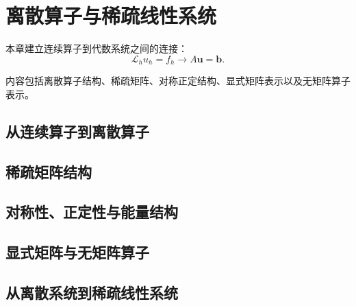 \chapter{离散算子与稀疏线性系统}
\label{ch:discrete-operator}

本章建立连续算子到代数系统之间的连接：
\[
\mathcal{L}_h u_h=f_h\rightarrow A\bm u=\bm b.
\]

内容包括离散算子结构、稀疏矩阵、对称正定结构、显式矩阵表示以及无矩阵算子表示。

\section{从连续算子到离散算子}

\section{稀疏矩阵结构}

\section{对称性、正定性与能量结构}

\section{显式矩阵与无矩阵算子}

\section{从离散系统到稀疏线性系统}
